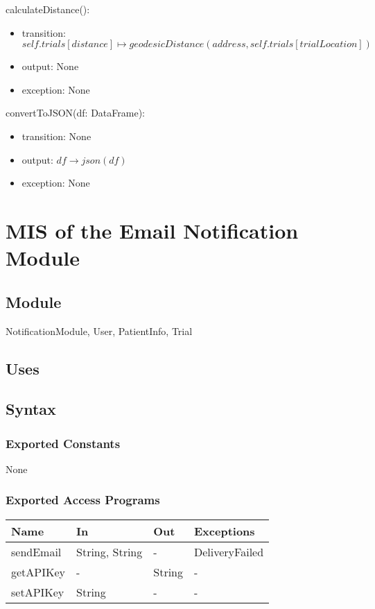 \documentclass[12pt, titlepage]{article}
\begin{document}
\noindent calculateDistance():
\begin{itemize}
\item transition: $self.trials[distance] \mapsto geodesicDistance(address, self.trials[trialLocation])$
\item output: None
\item exception: None
\end{itemize}

\noindent convertToJSON(df: DataFrame):
\begin{itemize}
\item transition: None
\item output:  $df \rightarrow json(df)$
\item exception: None
\end{itemize}


\section{MIS of the Email Notification Module} \label{User}

\subsection{Module}

NotificationModule, User, PatientInfo, Trial

\subsection{Uses}


\subsection{Syntax}

\subsubsection{Exported Constants}
None

\subsubsection{Exported Access Programs}

\begin{center}
\begin{tabular}{p{4cm} p{4cm} p{4cm} p{4cm}}
\hline
\textbf{Name} & \textbf{In} & \textbf{Out} & \textbf{Exceptions} \\
\hline
sendEmail & String, String & - & DeliveryFailed \\
\hline
getAPIKey & - & String & - \\
\hline
setAPIKey & String & - & - \\
\hline
\end{tabular}
\end{center}
\end{document}
